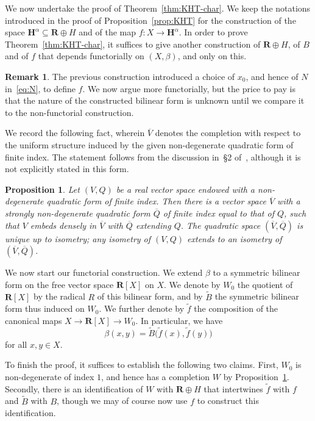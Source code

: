 \documentclass[11pt]{article}
\newtheorem{prop}[theo]{Proposition}
\theoremstyle{definition}
\newtheorem{rema}[theo]{Remark}
\numberwithin{equation}{section}
\numberwithin{figure}{section}
\numberwithin{table}{section}
\newcommand{\sH}{H}
\newcommand{\RR}{\mathbf{R}}
\newcommand{\HH}{\mathbf{H}}
\newcommand{\se}{\subseteq}
\newcommand{\wt}{\widetilde}
\begin{document}
We now undertake the proof of Theorem~\ref{thm:KHT-char}. We keep the notations introduced in the proof of Proposition~\ref{prop:KHT} for the construction of the space $\HH^\alpha\se \RR\oplus\sH$ and of the map $f\colon X\to \HH^\alpha$. In order to prove Theorem~\ref{thm:KHT-char}, it suffices to give another construction of $\RR\oplus\sH$, of $B$ and of $f$ that depends functorially on $(X, \beta)$, and only on this.

\begin{rema}
The previous construction introduced a choice of $x_0$, and hence of $N$ in~\eqref{eq:N}, to define $f$. We now argue more functorially, but the price to pay is that the nature of the constructed bilinear form is unknown until we compare it to the non-functorial construction.
\end{rema}

We record the following fact, wherein $\overline{V}$ denotes the completion with respect to the uniform structure induced by the given non-degenerate quadratic form of finite index. The statement follows from the discussion in~\S2 of~\cite{Burger-Iozzi-Monod}, although it is not explicitly stated in this form.

\begin{prop}\label{completion}
Let $(V,Q)$ be a real vector space endowed with a non-degenerate quadratic form of finite index. Then there is a vector space $\overline{V}$ with a strongly non-degenerate quadratic form $\overline{Q}$ of finite index equal to that of $Q$, such that $V$ embeds densely in $\overline{V}$ with $\overline{Q}$ extending $Q$. The quadratic space $(\overline{V},\overline{Q})$ is unique up to isometry; any isometry of $(V,Q)$ extends to an isometry of $(\overline{V},\overline{Q})$.
\end{prop}

We now start our functorial construction. We extend $\beta$ to a symmetric bilinear form on the free vector space $\RR[X]$ on $X$. We denote by $W_0$ the quotient of $\RR[X]$ by the radical $R$ of this bilinear form, and by $\wt B$ the symmetric bilinear form thus induced on $W_0$. We further denote by $\wt f$ the composition of the canonical maps $X\to \RR[X]\to W_0$. In particular, we have
\[
\beta(x,y) = \wt B\big(\wt f(x), \wt f(y)\big)
\]
for all $x,y\in X$.

To finish the proof, it suffices to establish the following two claims. First, $W_0$ is non-degenerate of index $1$, and hence has a completion $W$ by Proposition~\ref{completion}. Secondly, there is an identification of $W$ with $\RR\oplus\sH$ that intertwines $\wt f$ with $f$ and $\wt B$ with $B$, though we may of course now use $f$ to construct this identification.
\end{document}

